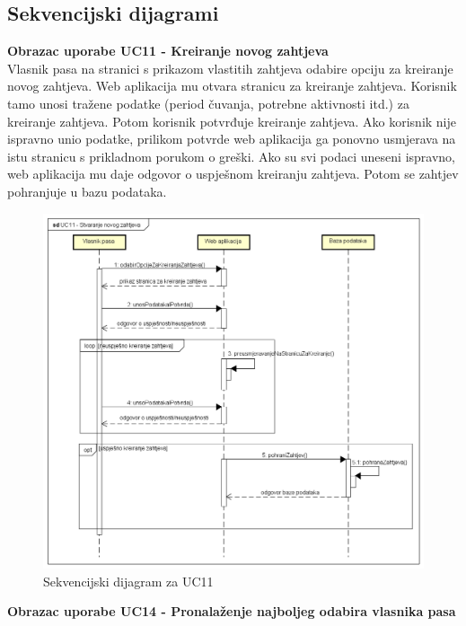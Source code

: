 			\subsection{Sekvencijski dijagrami}
				
				\textbf{Obrazac uporabe UC11 - Kreiranje novog zahtjeva}\\
				
				Vlasnik pasa na stranici s prikazom vlastitih zahtjeva odabire opciju za kreiranje novog zahtjeva. Web aplikacija mu otvara stranicu za kreiranje zahtjeva. Korisnik tamo unosi tražene podatke (period čuvanja, potrebne aktivnosti itd.) za kreiranje zahtjeva. Potom korisnik potvrđuje kreiranje zahtjeva. Ako korisnik nije ispravno unio podatke, prilikom potvrde web aplikacija ga ponovno usmjerava na istu stranicu s prikladnom porukom o greški. Ako su svi podaci uneseni ispravno, web aplikacija mu daje odgovor o uspješnom kreiranju zahtjeva. Potom se zahtjev pohranjuje u bazu podataka.
				
				\begin{figure}[htb]
					\centering
					\includegraphics[width=13cm]{slike/Sekvencijski dijagram - UC11}
					\caption{Sekvencijski dijagram za UC11}
					\label{fig:Sekvencijski-UC11}
				\end{figure}
				\eject		
				
				\textbf{Obrazac uporabe UC14 - Pronalaženje najboljeg odabira vlasnika pasa}\\
				
